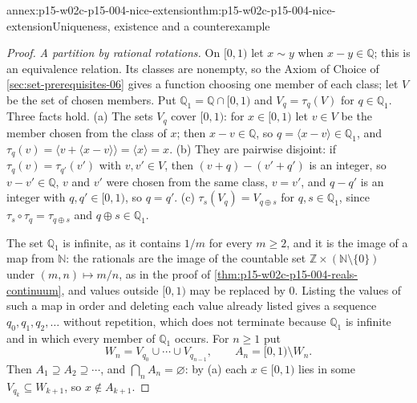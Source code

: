 \begin{annexitem}{annex:p15-w02c-p15-004-nice-extension}{thm:p15-w02c-p15-004-nice-extension}{Uniqueness, existence and a counterexample}
\begin{proof}
\emph{A partition by rational rotations.} On \([0,1)\) let \(x\sim y\) when
\(x-y\in\mathbb Q\); this is an equivalence relation. Its classes are
nonempty, so the Axiom of Choice of \cref{sec:set-prerequisites-06} gives
a function choosing one member of each class; let \(V\) be the set of
chosen members. Put \(\mathbb Q_1=\mathbb Q\cap[0,1)\) and
\(V_q=\tau_q(V)\) for \(q\in\mathbb Q_1\). Three facts hold.
(a) The sets \(V_q\) cover \([0,1)\): for \(x\in[0,1)\) let \(v\in V\) be
the member chosen from the class of \(x\); then \(x-v\in\mathbb Q\), so
\(q=\langle x-v\rangle\in\mathbb Q_1\), and
\(\tau_q(v)=\langle v+\langle x-v\rangle\rangle=\langle x\rangle=x\).
(b) They are pairwise disjoint: if \(\tau_q(v)=\tau_{q'}(v')\) with
\(v,v'\in V\), then \((v+q)-(v'+q')\) is an integer, so \(v-v'\in\mathbb Q\),
\(v\) and \(v'\) were chosen from the same class, \(v=v'\), and \(q-q'\)
is an integer with \(q,q'\in[0,1)\), so \(q=q'\).
(c) \(\tau_s(V_q)=V_{q\oplus s}\) for \(q,s\in\mathbb Q_1\), since
\(\tau_s\circ\tau_q=\tau_{q\oplus s}\) and \(q\oplus s\in\mathbb Q_1\).

The set \(\mathbb Q_1\) is infinite, as it contains \(1/m\) for every
\(m\geq2\), and it is the image of a map from \(\mathbb N\): the rationals
are the image of the countable set
\(\mathbb Z\times(\mathbb N\setminus\{0\})\) under \((m,n)\mapsto m/n\), as in
the proof of \cref{thm:p15-w02c-p15-004-reals-continuum}, and values outside
\([0,1)\) may be replaced by \(0\). Listing the values of such a map in
order and deleting each value already listed gives a sequence
\(q_0,q_1,q_2,\ldots\) without repetition, which does not terminate because
\(\mathbb Q_1\) is infinite and in which every member of \(\mathbb Q_1\)
occurs. For \(n\geq1\) put
\[
 W_n=V_{q_0}\cup\cdots\cup V_{q_{n-1}},\qquad A_n=[0,1)\setminus W_n .
\]
Then \(A_1\supseteq A_2\supseteq\cdots\), and \(\bigcap_nA_n=\varnothing\):
by (a) each \(x\in[0,1)\) lies in some \(V_{q_k}\subseteq W_{k+1}\), so
\(x\notin A_{k+1}\).


\end{proof}
\end{annexitem}
